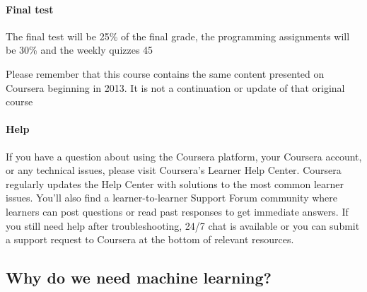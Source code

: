\paragraph{Final test}

The final test will be 25\% of the final grade, the programming assignments will be 30\% and the weekly quizzes 45%

Please remember that this course contains the same content presented on Coursera beginning in 2013. It is not a continuation or update of that original course


\paragraph{Help}

If you have a question about using the Coursera platform, your Coursera account, or any technical issues, please visit Coursera's Learner Help Center. Coursera regularly updates the Help Center with solutions to the most common learner issues. You'll also find a learner-to-learner Support Forum community where learners can post questions or read past responses to get immediate answers. If you still need help after troubleshooting, 24/7 chat is available or you can submit a support request to Coursera at the bottom of relevant resources.


\subsection{Why do we need machine learning?}

